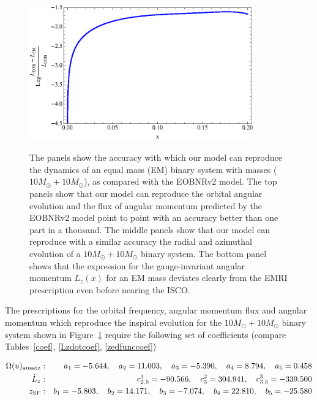 \begin{figure}[ht]
{}
\centerline{
\includegraphics[height=2.6in, width=3.8in,  clip]{figures/insimri/lzinveobvcem}
}
\caption{The panels show the accuracy with which our model can reproduce the dynamics of an equal mass (EM) binary system with masses  ( \(10M_{\odot} + 10M_{\odot}\)), as compared with the EOBNRv2 model. The top panels show that our model can reproduce the orbital angular evolution and the flux of angular momentum predicted by the EOBNRv2 model point to point with an accuracy better than one part in a thousand. The middle panels show that our model can reproduce with a similar accuracy the radial and azimuthal evolution of a   \(10M_{\odot} + 10M_{\odot}\) binary system. The bottom panel shows that the expression for the gauge-invariant angular momentum \(L_{z}(x)\) for an EM mass deviates clearly from the EMRI prescription even before nearing the ISCO. }
\label{emcase}
\end{figure}

The prescriptions for the orbital frequency, angular momentum flux and angular momentum which reproduce the inspiral evolution for the \(10M_{\odot} + 10M_{\odot}\) binary system shown in Figure~\ref{emcase} require the following set of coefficients (compare Tables~\ref{coef}, \ref{Lzdotcoef}, \ref{zedfunccoef})


\begin{eqnarray}
\Omega(u)_{\rm ansatz} &:& a_1= -5.644, \quad a_2 = 11.003, \quad a_3 = -5.390,\quad a_4 = 8.794, \quad a_5 = 0.458\\\nonumber
\dot{L}_z &:& c^{1}_{2.5} = -90.566, \quad c^2_3  =304.941, \quad c^3_{3.5}= -339.500\\\nonumber
z_{\rm SF} &:&  b_1 = -5.803,\quad  b_2= 14.171, \quad b_3 = -7.074, \quad b_4 = 22.810, \quad b_5 =-25.580\\\nonumber
\label{ecmcoe}
\end{eqnarray}

